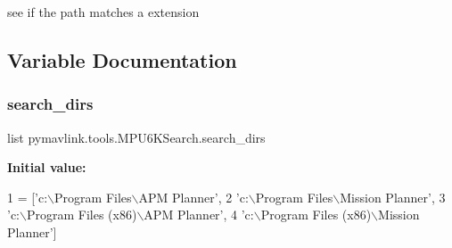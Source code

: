 \begin{DoxyVerb}see if the path matches a extension\end{DoxyVerb}
 

\subsection{Variable Documentation}
\mbox{\label{namespacepymavlink_1_1tools_1_1MPU6KSearch_a9ed3d2455a7095caeaeb4f078ce9b64c}} 
\subsubsection{\texorpdfstring{search\+\_\+dirs}{search\_dirs}}
{\footnotesize\ttfamily list pymavlink.\+tools.\+M\+P\+U6\+K\+Search.\+search\+\_\+dirs}

{\bfseries Initial value\+:}
\begin{DoxyCode}
1 =  [\textcolor{stringliteral}{'c:\(\backslash\)Program Files\(\backslash\)APM Planner'},
2                \textcolor{stringliteral}{'c:\(\backslash\)Program Files\(\backslash\)Mission Planner'},
3                \textcolor{stringliteral}{'c:\(\backslash\)Program Files (x86)\(\backslash\)APM Planner'},
4                \textcolor{stringliteral}{'c:\(\backslash\)Program Files (x86)\(\backslash\)Mission Planner'}]
\end{DoxyCode}
